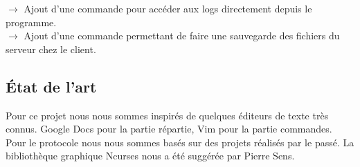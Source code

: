 \documentclass[12pt]{article}
\begin{document}
$\rightarrow$ Ajout d'une commande pour accéder aux logs directement depuis le programme.\\

$\rightarrow$ Ajout d'une commande permettant de faire une sauvegarde des fichiers du serveur chez le client.\\

\subsection{\'Etat de l'art}
Pour ce projet nous nous sommes inspirés de quelques éditeurs de texte très connus. Google Docs pour la partie répartie, Vim pour la partie commandes. Pour le protocole nous nous sommes basés sur des projets réalisés par le passé. La bibliothèque graphique Ncurses nous a été suggérée par Pierre Sens.
\end{document}
